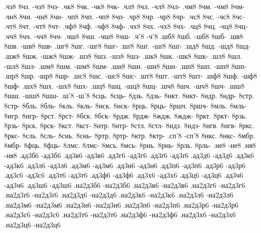 {.чз8 8чз. -чз8 8чз-
.чк8 8чк. -чк8 8чк-
.чл8 8чл. -чл8 8чл-
.чм8 8чм. -чм8 8чм-
.чн8 8чн. -чн8 8чн-
.чп8 8чп. -чп8 8чп-
.чр8 8чр. -чр8 8чр-
.чс8 8чс. -чс8 8чс-
.чт8 8чт. -чт8 8чт-
.чф8 8чф. -чф8 8чф-
.чх8 8чх. -чх8 8чх-
.чц8 8чц. -чц8 8чц-
.чч8 8чч. -чч8 8чч-
.чш8 8чш. -чш8 8чш-
.ч'8 -ч'8
.шб8 8шб. -шб8 8шб-
.шв8 8шв. -шв8 8шв-
.шг8 8шг. -шг8 8шг-
.шґ8 8шґ. -шґ8 8шґ-
.шд8 8шд. -шд8 8шд-
.шж8 8шж. -шж8 8шж-
.шз8 8шз. -шз8 8шз-
.шк8 8шк. -шк8 8шк-
.шл8 8шл. -шл8 8шл-
.шм8 8шм. -шм8 8шм-
.шн8 8шн. -шн8 8шн-
.шп8 8шп. -шп8 8шп-
.шр8 8шр. -шр8 8шр-
.шс8 8шс. -шс8 8шс-
.шт8 8шт. -шт8 8шт-
.шф8 8шф. -шф8 8шф-
.шх8 8шх. -шх8 8шх-
.шц8 8шц. -шц8 8шц-
.шч8 8шч. -шч8 8шч-
.шш8 8шш. -шш8 8шш-
.ш'8 -ш'8
%
%
%
8сць. 8сць-
8дзь. 8дзь-
8нкт. 8нкт-
8ндр. 8ндр-
8стр. 8стр-
8бль. 8бль-
8кль. 8кль-
8нск. 8нск-
8рць. 8рць-
8ршч. 8ршч-
8мль. 8мль-
8нгр. 8нгр-
8рст. 8рст-
8бск. 8бск-
8рдж. 8рдж-
8ждж. 8ждж-
8ркт. 8ркт-
8рзь. 8рзь-
8рск. 8рск-
8кст. 8кст-
8нтр. 8нтр-
8стл. 8стл-
8ндз. 8ндз-
8нгв. 8нгв-
8ркс. 8ркс-
8сль. 8сль-
8снь. 8снь-
8ртр. 8ртр-
8ктр. 8ктр-
.сп'8 -сп'8
8нкс. 8нкс-
8мбр. 8мбр-
8фць. 8фць-
8лмс. 8лмс-
8мсь. 8мсь-
8рнь. 8рнь-
8рль. 8рль-
%
%
%
.не8 -не8
.ня8 -ня8
%
%
%
.ад3б6 -ад3б6
.ад3в6 -ад3в6
.ад3г6 -ад3г6
.ад3ґ6 -ад3ґ6
.ад3д6 -ад3д6
.ад3к6 -ад3к6
.ад3л6 -ад3л6
.ад3м6 -ад3м6
.ад3н6 -ад3н6
.ад3п6 -ад3п6
.ад3р6 -ад3р6
.ад3с6 -ад3с6
.ад3т6 -ад3т6
.ад3ф6 -ад3ф6
.ад3х6 -ад3х6
.ад3ц6 -ад3ц6
.ад3ч6 -ад3ч6
.ад3ш6 -ад3ш6
.на2д3б6 -на2д3б6
.на2д3в6 -на2д3в6
.на2д3г6 -на2д3г6
.на2д3ґ6 -на2д3ґ6
.на2д3д6 -на2д3д6
.на2д3к6 -на2д3к6
.на2д3л6 -на2д3л6
.на2д3м6 -на2д3м6
.на2д3н6 -на2д3н6
.на2д3п6 -на2д3п6
.на2д3р6 -на2д3р6
.на2д3с6 -на2д3с6
.на2д3т6 -на2д3т6
.на2д3ф6 -на2д3ф6
.на2д3х6 -на2д3х6
.на2д3ц6 -на2д3ц6
}
